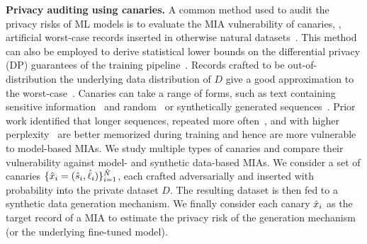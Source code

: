 \textbf{Privacy auditing using canaries.} 
A common method used to audit the privacy risks of ML models is to evaluate the MIA vulnerability of canaries, \ie, artificial worst-case records inserted in otherwise natural datasets~\citep{carlini2019secret}. This method can also be employed to derive statistical lower bounds on the differential privacy (DP) guarantees of the training pipeline~\citep{jagielski2020auditing,bayesian-estimation:2023}. 
%
Records crafted to be out-of-distribution \wrt the underlying data distribution of $D$ give a good approximation to the worst-case~\citep{carlini2019secret,meeuscopyright}.
%
Canaries can take a range of forms, such as text containing sensitive information~\citep{carlini2019secret} and random~\citep{wei2024proving} or synthetically generated sequences~\citep{meeuscopyright}.
%
Prior work identified that longer sequences, repeated more often~\citep{carlini2022quantifying}, and with higher perplexity~\citep{meeuscopyright} are better memorized during training and hence are more vulnerable to model-based MIAs.
%
We study multiple types of canaries and compare their vulnerability against model- and synthetic data-based MIAs. 
%
We consider a set of canaries $\{{\hat{x}}_i = ({\hat{s}}_i, {\hat{\ell}}_i) \}_{i=1}^{\hat{N}}$, each crafted adversarially and inserted with probability  into the private dataset $D$.
The resulting dataset is then fed to a synthetic data generation mechanism.
%
We finally consider each canary ${\hat{x}}_i$ as the target record of a MIA to estimate the privacy risk of the generation mechanism (or the underlying fine-tuned model).



